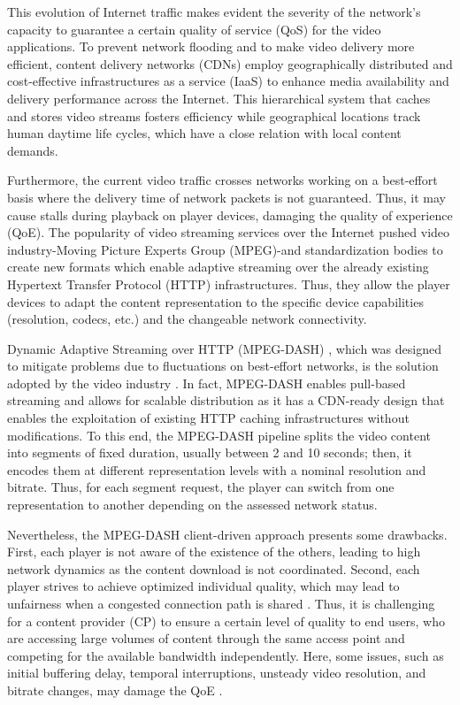 This evolution of Internet traffic makes evident the severity of the network’s capacity to guarantee a certain quality of service (QoS) for the video applications. To prevent network flooding and to make video delivery more efficient, content delivery networks (CDNs) employ geographically distributed and cost-effective infrastructures as a service (IaaS) to enhance media availability and delivery performance across the Internet. This hierarchical system that caches and stores video streams fosters efficiency while geographical locations track human daytime life cycles, which have a close relation with local content demands.

Furthermore, the current video traffic crosses networks working on a best-effort basis where the delivery time of network packets is not guaranteed. Thus, it may cause stalls during playback on player devices, damaging the quality of experience (QoE). The popularity of video streaming services over the Internet pushed video industry-Moving Picture Experts Group (MPEG)-and standardization bodies to create new formats which enable adaptive streaming over the already existing Hypertext Transfer Protocol (HTTP) infrastructures. Thus, they allow the player devices to adapt the content representation to the specific device capabilities (resolution, codecs, etc.) and the changeable network connectivity.

Dynamic Adaptive Streaming over HTTP (MPEG-DASH) \cite{sodagar2011mpeg}, which was designed to mitigate problems due to fluctuations on best-effort networks, is the solution adopted by the video industry \cite{park2017}. In fact, MPEG-DASH enables pull-based streaming \cite{begen2011} and allows for scalable distribution as it has a CDN-ready design \cite{maille2016} that enables the exploitation of existing HTTP caching infrastructures without modifications. To this end, the MPEG-DASH pipeline splits the video content into segments of fixed duration, usually between 2 and 10 seconds; then, it encodes them at different representation levels with a nominal resolution and bitrate. Thus, for each segment request, the player can switch from one representation to another depending on the assessed network status.

Nevertheless, the MPEG-DASH client-driven approach presents some drawbacks. First, each player is not aware of the existence of the others, leading to high network dynamics as the content download is not coordinated. Second, each player strives to achieve optimized individual quality, which may lead to unfairness when a congested connection path is shared \cite{akhshabi2012}. Thus, it is challenging for a content provider (CP) to ensure a certain level of quality to end users, who are accessing large volumes of content through the same access point and competing for the available bandwidth independently. Here, some issues, such as initial buffering delay, temporal interruptions, unsteady video resolution, and bitrate changes, may damage the QoE \cite{Seufert2014}.

